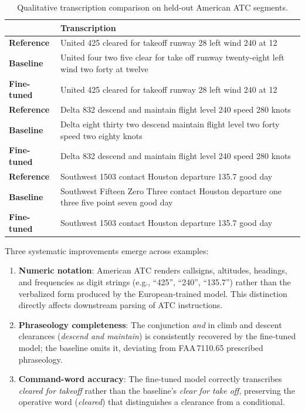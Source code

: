\documentclass[11pt,a4paper]{article}
\begin{document}
\begin{table}[h]
\centering
\caption{Qualitative transcription comparison on held-out American ATC segments.}
\label{tab:qualitative}
\begin{tabularx}{\linewidth}{lX}
\toprule
& \textbf{Transcription} \\
\midrule
\textbf{Reference}  & United 425 cleared for takeoff runway 28 left wind 240 at 12 \\
\textbf{Baseline}   & United four two five clear for take off runway twenty-eight left wind two forty at twelve \\
\textbf{Fine-tuned} & United 425 cleared for takeoff runway 28 left wind 240 at 12 \\
\midrule
\textbf{Reference}  & Delta 832 descend and maintain flight level 240 speed 280 knots \\
\textbf{Baseline}   & Delta eight thirty two descend maintain flight level two forty speed two eighty knots \\
\textbf{Fine-tuned} & Delta 832 descend and maintain flight level 240 speed 280 knots \\
\midrule
\textbf{Reference}  & Southwest 1503 contact Houston departure 135.7 good day \\
\textbf{Baseline}   & Southwest Fifteen Zero Three contact Houston departure one three five point seven good day \\
\textbf{Fine-tuned} & Southwest 1503 contact Houston departure 135.7 good day \\
\bottomrule
\end{tabularx}
\end{table}

Three systematic improvements emerge across examples:
\begin{enumerate}[noitemsep]
  \item \textbf{Numeric notation}: American ATC renders callsigns, altitudes,
        headings, and frequencies as digit strings (e.g., ``425'', ``240'',
        ``135.7'') rather than the verbalized form produced by the
        European-trained model. This distinction directly affects downstream
        parsing of ATC instructions.
  \item \textbf{Phraseology completeness}: The conjunction \textit{and} in
        climb and descent clearances (\textit{descend and maintain}) is
        consistently recovered by the fine-tuned model; the baseline omits
        it, deviating from FAA\,7110.65 prescribed phraseology.
  \item \textbf{Command-word accuracy}: The fine-tuned model correctly
        transcribes \textit{cleared for takeoff} rather than the baseline's
        \textit{clear for take off}, preserving the operative word
        (\textit{cleared}) that distinguishes a clearance from a conditional.
\end{enumerate}
\end{document}
